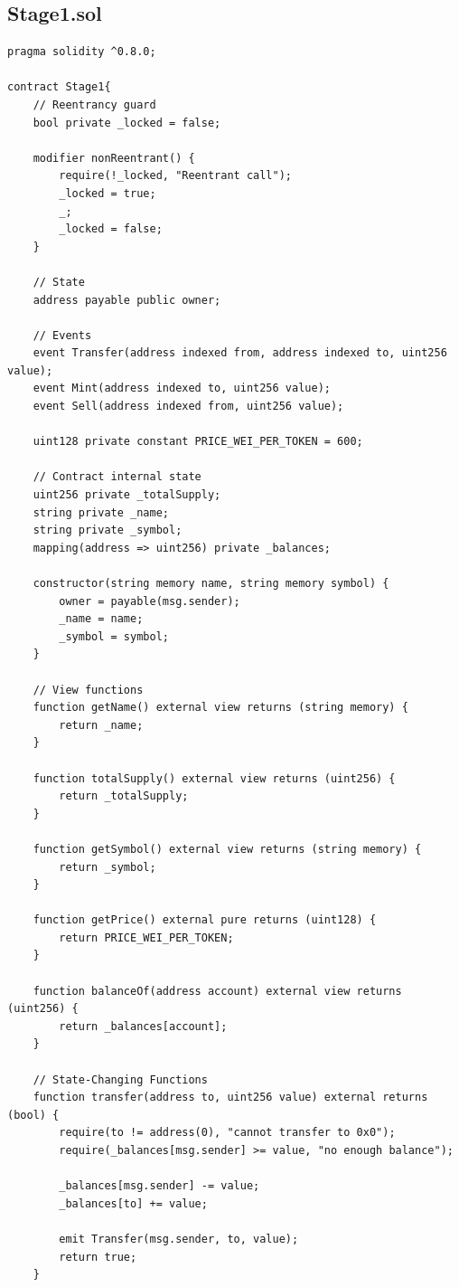 \documentclass[10pt,a4paper]{article}
\begin{document}
\subsection*{Stage1.sol}
\begin{lstlisting}[caption={Stage1.sol}]
pragma solidity ^0.8.0;

contract Stage1{
    // Reentrancy guard
    bool private _locked = false;
    
    modifier nonReentrant() {
        require(!_locked, "Reentrant call");
        _locked = true;
        _;
        _locked = false;
    }
    
    // State 
    address payable public owner;
    
    // Events
    event Transfer(address indexed from, address indexed to, uint256 value);
    event Mint(address indexed to, uint256 value);
    event Sell(address indexed from, uint256 value);

    uint128 private constant PRICE_WEI_PER_TOKEN = 600;

    // Contract internal state
    uint256 private _totalSupply;
    string private _name;
    string private _symbol;
    mapping(address => uint256) private _balances;

    constructor(string memory name, string memory symbol) {
        owner = payable(msg.sender);
        _name = name;
        _symbol = symbol;
    }

    // View functions
    function getName() external view returns (string memory) {
        return _name;
    }

    function totalSupply() external view returns (uint256) {
        return _totalSupply;
    }

    function getSymbol() external view returns (string memory) {
        return _symbol;
    }

    function getPrice() external pure returns (uint128) {
        return PRICE_WEI_PER_TOKEN;
    }

    function balanceOf(address account) external view returns (uint256) {
        return _balances[account];
    }

    // State-Changing Functions
    function transfer(address to, uint256 value) external returns (bool) {
        require(to != address(0), "cannot transfer to 0x0");
        require(_balances[msg.sender] >= value, "no enough balance");

        _balances[msg.sender] -= value;
        _balances[to] += value;

        emit Transfer(msg.sender, to, value);
        return true;
    }


\end{lstlisting}
\end{document}
